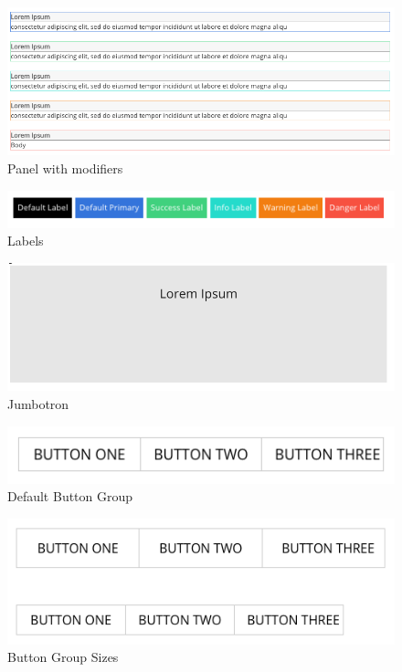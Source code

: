 \begin{figure}[h]
\caption{Panel with modifiers}
  \label{fig:panelmod}
  \includegraphics[scale=0.4]{../public/images/panelmod}
\centering
\end{figure}

\begin{figure}[h]
\caption{Labels}
  \label{fig:label}
  \includegraphics[scale=0.5]{../public/images/labels}
\centering
\end{figure}

\begin{figure}[h]
\caption{Jumbotron}
  \label{fig:jumbo}
  \includegraphics[scale=0.4]{../public/images/jumbrotron}
\centering
\end{figure}

\begin{figure}[h]
\caption{Default Button Group}
  \label{fig:defualtgroup}
\includegraphics[scale=0.5]{../public/images/button-group=defualt}
\centering
\end{figure}

\begin{figure}[h]
\caption{Button Group Sizes}
  \label{fig:groupSize}
\includegraphics[scale=0.5]{../public/images/button-group-size}
\centering
\end{figure}


